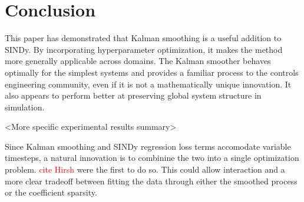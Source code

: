 \documentclass{article}
\newcommand{\red}[1]{\textcolor{red}{#1}}
\begin{document}
\section{Conclusion}
This paper has demonstrated that Kalman smoothing is a useful addition to SINDy.  By incorporating hyperparameter optimization, it makes the method more generally applicable across domains. The Kalman smoother behaves optimally for the simplest systems and provides a familiar process to the controls engineering community, even if it is not a mathematically unique innovation.  It also appears to perform better at preserving global system structure in simulation.

<More specific experimental results summary>

Since Kalman smoothing and SINDy regression loss terms accomodate variable timesteps, a natural innovation is to combinine the two into a single optimization problem.  \red{cite Hirsh} were the first to do so.  This could allow interaction and a more clear tradeoff between fitting the data through either the smoothed process or the coefficient sparsity.
\end{document}
